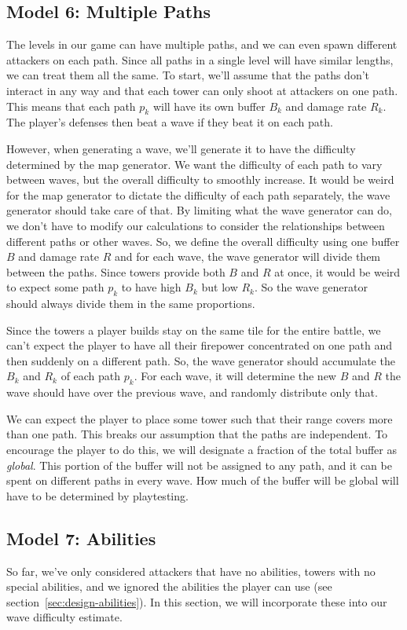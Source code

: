 \subsection{Model 6: Multiple Paths}
The levels in our game can have multiple paths, and we can even spawn different attackers on each path.
Since all paths in a single level will have similar lengths, we can treat them all the same.
To start, we'll assume that the paths don't interact in any way and that each tower can only shoot at attackers on one path.
This means that each path $p_k$ will have its own buffer $B_k$ and damage rate $R_k$.
The player's defenses then beat a wave if they beat it on each path.

However, when generating a wave, we'll generate it to have the difficulty determined by the map generator.
We want the difficulty of each path to vary between waves, but the overall difficulty to smoothly increase.
It would be weird for the map generator to dictate the difficulty of each path separately, the wave generator should take care of that.
By limiting what the wave generator can do, we don't have to modify our calculations to consider the relationships between different paths or other waves.
So, we define the overall difficulty using one buffer $B$ and damage rate $R$ and for each wave, the wave generator will divide them between the paths.
Since towers provide both $B$ and $R$ at once, it would be weird to expect some path $p_k$ to have high $B_k$ but low $R_k$.
So the wave generator should always divide them in the same proportions.

Since the towers a player builds stay on the same tile for the entire battle, we can't expect the player to have all their firepower concentrated on one path and then suddenly on a different path.
So, the wave generator should accumulate the $B_k$ and $R_k$ of each path $p_k$.
For each wave, it will determine the new $B$ and $R$ the wave should have over the previous wave, and randomly distribute only that.

We can expect the player to place some tower such that their range covers more than one path.
This breaks our assumption that the paths are independent.
To encourage the player to do this, we will designate a fraction of the total buffer as \emph{global}.
This portion of the buffer will not be assigned to any path, and it can be spent on different paths in every wave.
How much of the buffer will be global will have to be determined by playtesting.

\subsection{Model 7: Abilities}
So far, we've only considered attackers that have no abilities, towers with no special abilities, and we ignored the abilities the player can use (see section~\ref{sec:design-abilities}).
In this section, we will incorporate these into our wave difficulty estimate.

